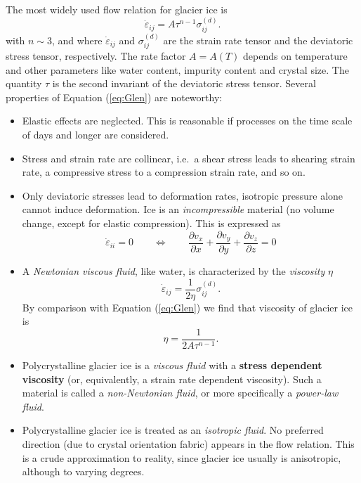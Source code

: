 \documentclass[11pt,DIV12,a4paper,halfparskip]{scrartcl}
\newcommand{\epsdot}{\dot{\varepsilon}}
\begin{document}
The most widely used flow relation for glacier ice is
\citep{Glen1955,Steinemann1954}
%  
\begin{equation}
  \label{eq:Glen} \epsdot_{ij} = A \tau^{n-1}\sigma^{(d)}_{ij}.
\end{equation}
%
with $n\sim 3$, and where $\epsdot_{ij}$ and $\sigma^{(d)}_{ij}$ are
the strain rate tensor and the deviatoric stress tensor, respectively.
The rate factor $A = A(T)$ depends on temperature and other parameters
like water content, impurity content and crystal size.  The quantity
$\tau$ is the second invariant of the deviatoric stress tensor.
%
Several properties of Equation (\ref{eq:Glen}) are noteworthy:
\begin{itemize}
\item Elastic effects are neglected.  This is reasonable if processes on the
  time scale of days and longer are considered.
\item Stress and strain rate are collinear, i.e.~a shear stress leads to
  shearing strain rate, a compressive stress to a compression strain rate, and
  so on.
\item Only deviatoric stresses lead to deformation rates, isotropic pressure
  alone cannot induce deformation. Ice is an \emph{incompressible} material
  (no volume change, except for elastic compression).  This is expressed as
  \[
  \epsdot_{ii} = 0 \qquad \Longleftrightarrow \qquad
  \frac{\partial v_x}{\partial x} + \frac{\partial v_y}{\partial y} +
  \frac{\partial v_z}{\partial z} = 0
  \]
\item A \emph{Newtonian viscous fluid}, like water, is characterized by
  the \emph{viscosity} $\eta$
  \begin{equation}
    \label{eq:viscosity-newtonian}
  \epsdot_{ij} = \frac{1}{2\eta} \sigma^{(d)}_{ij}.
  \end{equation}
  By comparison with Equation (\ref{eq:Glen}) we find that viscosity of
  glacier ice is
  \[
  \eta=\frac{1}{2A\tau^{n-1}}.
  \]

\item Polycrystalline glacier ice is a \emph{viscous fluid} with a
  \textbf{stress dependent viscosity} (or, equivalently, a strain rate
  dependent viscosity).  Such a material is called a \emph{non-Newtonian
    fluid}, or more specifically a \emph{power-law fluid}.
\item Polycrystalline glacier ice is treated as an \emph{isotropic fluid}. No
  preferred direction (due to crystal orientation fabric) appears in the flow
  relation.  This is a crude approximation to reality, since glacier ice
  usually is anisotropic, although to varying degrees.
  
\end{itemize}
\end{document}
